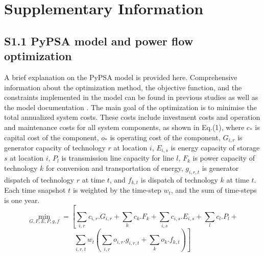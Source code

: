 
	
	\clearpage
	
	\section*{Supplementary Information}
	
	
	\subsection*{S1.1 PyPSA model and power flow optimization}
	
	A brief explanation on the PyPSA model is provided here. Comprehensive information about the optimization method, the objective function, and the constraints implemented in the model can be found in previous studies  as well as the model documentation . The main goal of the optimization is to minimise the total annualized system costs. These costs include investment costs and operation and maintenance costs for all system components, as shown in Eq.(1), where \(c_{*}\) is capital cost of the component, \(o_{*}\) is operating cost of the component, \(G_{i,r}\) is generator capacity of technology \(r\) at location \(i\), \(E_{i,s}\) is energy capacity of storage \(s\) at location \(i\), \(P_{l}\) is transmission line capacity for line \(l\), \(F_{k}\) is power capacity of technology \(k\) for conversion and transportation of energy, \(g_{i,r,t}\) is generator dispatch of technology \(r\)  at time \(t\), and \(f_{k,t}\) is dispatch of technology \(k\) at time \(t\). Each time snapshot \(t\) is weighted by the time-step \(w_{t}\), and the sum of time-steps is one year.
	\begin{equation*}
		\min_{G,F,E,P,g,f} = \left[ \sum_{i,r}^{}c_{i,r}.G_{i,r} + \sum_{k}^{}c_{k}.F_{k}+ \sum_{i,s}^{}c_{i,s}.E_{i,s}+ 
		\sum_{l}^{}c_{l}.P_{l}+ 
		\right.
	\end{equation*}
	\begin{equation}
		\left.\sum_{i,r,t}^{}w_{t}\left(\sum_{i,r}^{}o_{i,r}.g_{i,r,t}+\sum_{k}^{}o_{k}.f_{k,t}  \right)   \right]
	\end{equation}
	
